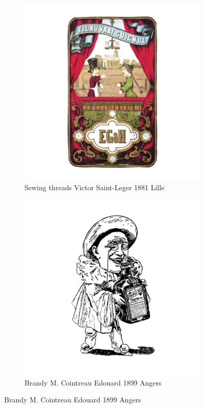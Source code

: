 \begin{figure}[h]
  \centering
  \begin{subfigure}{.45\textwidth}
    \centering
    \includegraphics[width=.5\linewidth]{images/supplement/trademarks/french/5_41}
    \caption{Sewing threads Victor Saint-Leger 1881 Lille}
    \label{fig:trademarks:french:5.41}
  \end{subfigure}
  \begin{subfigure}{.45\textwidth}
    \centering
    \includegraphics[width=.5\linewidth]{images/supplement/trademarks/french/5_52}
    \caption{Brandy M. Cointreau Edouard 1899 Angers}
    \label{fig:trademarks:french:5.52}
  \end{subfigure}


\end{figure}
